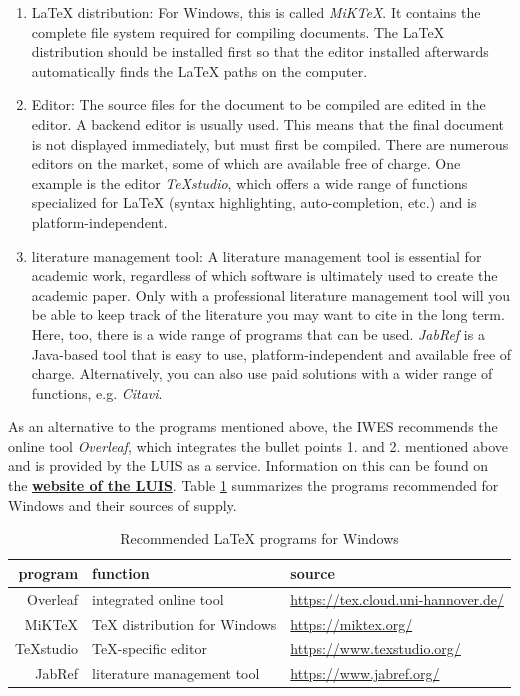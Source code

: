 \begin{enumerate}
	\item \LaTeX{} distribution: For Windows, this is called \textit{MiKTeX}. It contains the complete file system required for compiling documents. The \LaTeX{} distribution should be installed first so that the editor installed afterwards automatically finds the \LaTeX{} paths on the computer.\\
	\item Editor: The source files for the document to be compiled are edited in the editor. A backend editor is usually used. This means that the final document is not displayed immediately, but must first be compiled. There are numerous editors on the market, some of which are available free of charge. One example is the editor \textit{TeXstudio}, which offers a wide range of functions specialized for \LaTeX{} (syntax highlighting, auto-completion, etc.) and is platform-independent. \\
	\item literature management tool: A literature management tool is essential for academic work, regardless of which software is ultimately used to create the academic paper. Only with a professional literature management tool will you be able to keep track of the literature you may want to cite in the long term. Here, too, there is a wide range of programs that can be used. \textit{JabRef} is a Java-based tool that is easy to use, platform-independent and available free of charge. Alternatively, you can also use paid solutions with a wider range of functions, e.g. \textit{Citavi}.
\end{enumerate}



As an alternative to the programs mentioned above, the IWES recommends the online tool \textit{Overleaf}, which integrates the bullet points 1. and 2. mentioned above and is provided by the LUIS as a service. Information on this can be found on the \href{https://www.luis.uni-hannover.de/de/services/speichersysteme/dateiservice/cloud-dienste/overleaf}{\textbf{website of the LUIS}}. Table \ref{tab:programs} summarizes the programs recommended for Windows and their sources of supply.


\begin{table}[!htbp]
	\normalsize
	\centering
	\caption[Recommended \LaTeX{} programs for Windows systems.]{Recommended \LaTeX{} programs for Windows}
	\begin{tabular}{rll}
		\toprule
		\textbf{program} & \textbf{function} & \textbf{source} \\
		\midrule
		Overleaf & integrated online tool & \url{https://tex.cloud.uni-hannover.de/}\\
		MiKTeX & TeX distribution for Windows & \url{https://miktex.org/} \\
		TeXstudio & TeX-specific editor & \url{https://www.texstudio.org/} \\
		JabRef & literature management tool & \url{https://www.jabref.org/} \\
		\bottomrule
	\end{tabular}%
	\label{tab:programs}%
\end{table}%


